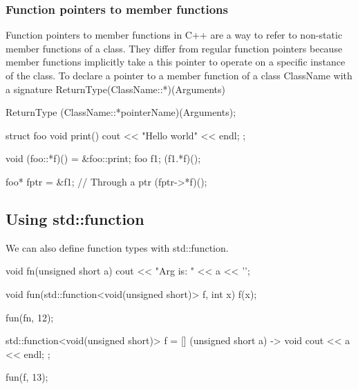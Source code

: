 \documentclass{report}
\begin{document}
    \bigbreak \noindent 
    \subsubsection{Function pointers to member functions}
    \bigbreak \noindent 
    Function pointers to member functions in C++ are a way to refer to non-static member functions of a class. They differ from regular function pointers because member functions implicitly take a this pointer to operate on a specific instance of the class.
    \bigbreak \noindent 
    To declare a pointer to a member function of a class ClassName with a signature ReturnType(ClassName::*)(Arguments)
    \bigbreak \noindent 
    \begin{cppcode}
        ReturnType (ClassName::*pointerName)(Arguments);
    \end{cppcode}
    \bigbreak \noindent 
    \begin{cppcode}
        struct foo {
            void print() {
                cout << "Hello world" << endl;
            }
        };

        void (foo::*f)() = &foo::print;
        foo f1;
        (f1.*f)();

        foo* fptr = &f1; // Through a ptr
        (fptr->*f)();
    \end{cppcode}

    \pagebreak \bigbreak \noindent 
    \subsection{Using std::function}
    \bigbreak \noindent 
    We can also define function types with std::function.
    \bigbreak \noindent 
    \begin{cppcode}
        void fn(unsigned short a) {
            cout << "Arg is: " << a << '\n';
        }

        void fun(std::function<void(unsigned short)> f, int x) {
            f(x);
        }

        fun(fn, 12);

        std::function<void(unsigned short)> f = [] (unsigned short a) -> void {
            cout << a << endl;
        };

        fun(f, 13);
    \end{cppcode}

    \bigbreak \noindent 
\end{document}
